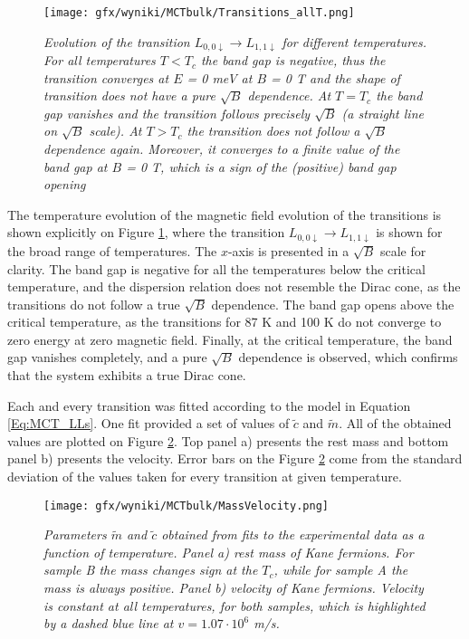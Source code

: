 \documentclass[titlepage,a4paper]{book}
\begin{document}
\begin{figure}[ht]
	\centering
	\texttt{[image: gfx/wyniki/MCTbulk/Transitions\_allT.png]}
	\vspace{-10pt}
	\caption{\textit{Evolution of the transition $L_{0,0\downarrow} \rightarrow L_{1,1\downarrow}$ for different temperatures. For all temperatures $T < T_c$ the band gap is negative, thus the transition converges at $E$ = 0 meV at $B$ = 0 T and the shape of transition does not have a pure $\sqrt{B}$ dependence. At $T = T_c$ the band gap vanishes and the transition follows precisely $\sqrt{B}$ (a straight line on $\sqrt{B}$ scale). At $T > T_c$ the transition does not follow a $\sqrt{B}$ dependence again. Moreover, it converges to a finite value of the band gap at $B$ = 0 T, which is a sign of the (positive) band gap opening}}
	\label{fig:Bulk_Transitions_allT}
\end{figure}
The temperature evolution of the magnetic field evolution of the transitions is shown explicitly on Figure \ref{fig:Bulk_Transitions_allT}, where the transition $L_{0,0\downarrow} \rightarrow L_{1,1\downarrow}$ is shown for the broad range of temperatures. The $x$-axis is presented in a $\sqrt{B}$ scale for clarity. The band gap is negative for all the temperatures below the critical temperature, and the dispersion relation does not resemble the Dirac cone, as the transitions do not follow a true $\sqrt{B}$ dependence. The band gap opens above the critical temperature, as the transitions for 87 K and 100 K do not converge to zero energy at zero magnetic field. Finally, at the critical temperature, the band gap vanishes completely, and a pure $\sqrt{B}$ dependence is observed, which confirms that the system exhibits a true Dirac cone.

Each and every transition was fitted according to the model in Equation \ref{Eq:MCT_LLs}. One fit provided a set of values of $\tilde{c}$ and $\tilde{m}$. All of the obtained values are plotted on Figure \ref{fig:Bulk_MassVelocity}. Top panel a) presents the rest mass and bottom panel b) presents the velocity. Error bars on the Figure \ref{fig:Bulk_MassVelocity} come from the standard deviation of the values taken for every transition at given temperature.

\begin{figure}[ht]
	\centering
	\texttt{[image: gfx/wyniki/MCTbulk/MassVelocity.png]}
	\vspace{-10pt}
	\caption{\textit{Parameters $\tilde{m}$ and $\tilde{c}$ obtained from fits to the experimental data as a function of temperature. Panel a) rest mass of Kane fermions. For sample B the mass changes sign at the $T_c$, while for sample A the mass is always positive. Panel b) velocity of Kane fermions. Velocity is constant at all temperatures, for both samples, which is highlighted by a dashed blue line at $v = 1.07 \cdot 10^6$ m/s. }}
	\label{fig:Bulk_MassVelocity}
\end{figure}
\end{document}
